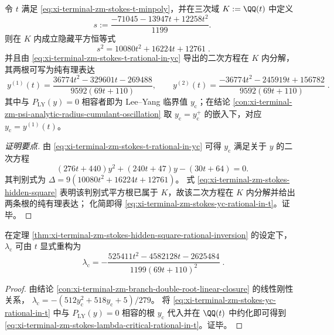 \begin{theorem}[隐藏平方与纯有理反演：由 \texorpdfstring{$t=B^{2}$}{t=B^2} 重构 \texorpdfstring{$y_{\mathrm c}$}{yc}]\label{thm:xi-terminal-zm-stokes-hidden-square-rational-inversion}
令 \(t\) 满足 \eqref{eq:xi-terminal-zm-stokes-t-minpoly}，并在三次域 \(K:=\QQ(t)\) 中定义
\begin{equation}\label{eq:xi-terminal-zm-stokes-s-def}
s:=\frac{-71045-13947t+12258t^{2}}{1199}.
\end{equation}
则在 \(K\) 内成立隐藏平方恒等式
\begin{equation}\label{eq:xi-terminal-zm-stokes-hidden-square}
\boxed{\;
s^{2}=10080t^{2}+16224t+12761\; }.
\end{equation}
并且由 \eqref{eq:xi-terminal-zm-stokes-t-rational-in-yc} 导出的二次方程在 \(K\) 内分解，其两根可写为纯有理表达
\begin{equation}\label{eq:xi-terminal-zm-stokes-yc-rational-in-t}
\boxed{\;
y^{(1)}(t)
=\frac{36774t^{2}-329601t-269488}{9592(69t+110)},
\qquad
y^{(2)}(t)
=\frac{-36774t^{2}-245919t+156782}{9592(69t+110)}\; }.
\end{equation}
其中与 \(P_{\mathrm{LY}}(y)=0\) 相容者即为 Lee--Yang 临界值 \(y_{\mathrm c}\)；在结论 \ref{con:xi-terminal-zm-psi-analytic-radius-cumulant-oscillation} 取 \(y_{\mathrm c}=y_{\mathrm c}^{+}\) 的嵌入下，对应 \(y_{\mathrm c}=y^{(1)}(t)\)。
\end{theorem}
\begin{proof}[证明要点]
由 \eqref{eq:xi-terminal-zm-stokes-t-rational-in-yc} 可得 \(y_{\mathrm c}\) 满足关于 \(y\) 的二次方程
\[
(276t+440)y^{2}+(240t+47)y-(30t+64)=0.
\]
其判别式为
\(
\Delta=9(10080t^{2}+16224t+12761)
\)。
式 \eqref{eq:xi-terminal-zm-stokes-hidden-square} 表明该判别式平方根已属于 \(K\)，故该二次方程在 \(K\) 内分解并给出两条根的纯有理表达；
化简即得 \eqref{eq:xi-terminal-zm-stokes-yc-rational-in-t}。证毕。
\end{proof}

\begin{proposition}[临界谱值的幅值重构]\label{prop:xi-terminal-zm-stokes-lambda-critical-rational-in-t}
在定理 \ref{thm:xi-terminal-zm-stokes-hidden-square-rational-inversion} 的设定下，
\(\lambda_{\mathrm c}\) 可由 \(t\) 显式重构为
\begin{equation}\label{eq:xi-terminal-zm-stokes-lambda-critical-rational-in-t}
\boxed{\;
\lambda_{\mathrm c}
=-\frac{525411t^{2}-4582128t-2625484}{1199(69t+110)^{2}}\; }.
\end{equation}
\end{proposition}
\begin{proof}
由结论 \ref{con:xi-terminal-zm-branch-double-root-linear-closure} 的线性刚性关系，
\(
\lambda_{\mathrm c}=-(512y_{\mathrm c}^{2}+518y_{\mathrm c}+5)/279
\)。
将 \eqref{eq:xi-terminal-zm-stokes-yc-rational-in-t} 中与 \(P_{\mathrm{LY}}(y)=0\) 相容的根 \(y_{\mathrm c}\) 代入并在 \(\QQ(t)\) 中约化即可得到 \eqref{eq:xi-terminal-zm-stokes-lambda-critical-rational-in-t}。证毕。
\end{proof}

